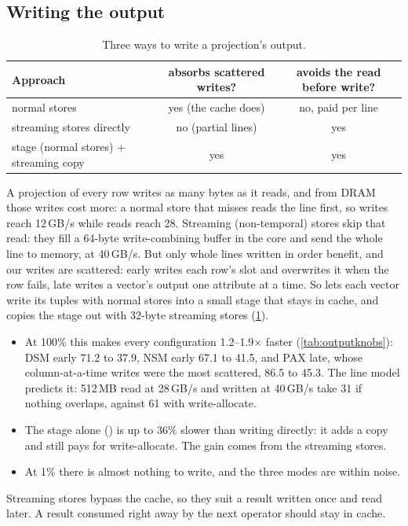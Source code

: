 \subsection{Writing the output}
\label{sec:tuning:output}

\begin{table}[t]
\centering\small
\caption{Three ways to write a projection's output.}
\label{tab:stage}
\begin{tabular}{lcc}
\toprule
Approach & absorbs scattered writes? & avoids the read before write? \\
\midrule
normal stores & yes (the cache does) & no, paid per line \\
streaming stores directly & no (partial lines) & yes \\
stage (normal stores) + streaming copy & yes & yes \\
\bottomrule
\end{tabular}
\end{table}

\begin{table}[t]
\centering\small
\caption{Projections of every row (ms) with direct writes, a stage copied with , and
a stage copied with streaming (NT) stores.}
\label{tab:outputknobs}
\end{table}

A projection of every row writes as many bytes as it reads, and from DRAM those writes cost
more: a normal store that misses reads the line first, so writes reach 12\,GB/s while reads
reach 28. Streaming (non-temporal) stores skip that read: they fill a 64-byte write-combining
buffer in the core and send the whole line to memory, at 40\,GB/s. But only whole lines written
in order benefit, and our writes are scattered: early writes each row's slot and overwrites it
when the row fails, late writes a vector's output one attribute at a time. So
 lets each vector write its tuples with normal stores into a small stage that
stays in cache, and copies the stage out with 32-byte streaming stores (\cref{tab:stage}).
\begin{itemize}
\item At 100\% this makes every configuration 1.2--1.9$\times$ faster
(\cref{tab:outputknobs}): DSM early 71.2 to 37.9\ms, NSM early 67.1 to 41.5\ms, and PAX late,
whose column-at-a-time writes were the most scattered, 86.5 to 45.3\ms. The line model predicts
it: 512\,MB read at 28\,GB/s and written at 40\,GB/s take 31\ms{} if nothing overlaps, against
61\ms{} with write-allocate.
\item The stage alone () is up to 36\% slower than writing directly: it adds a
copy and still pays for write-allocate. The gain comes from the streaming stores.
\item At 1\% there is almost nothing to write, and the three modes are within noise.
\end{itemize}
Streaming stores bypass the cache, so they suit a result written once and read later. A result
consumed right away by the next operator should stay in cache.

